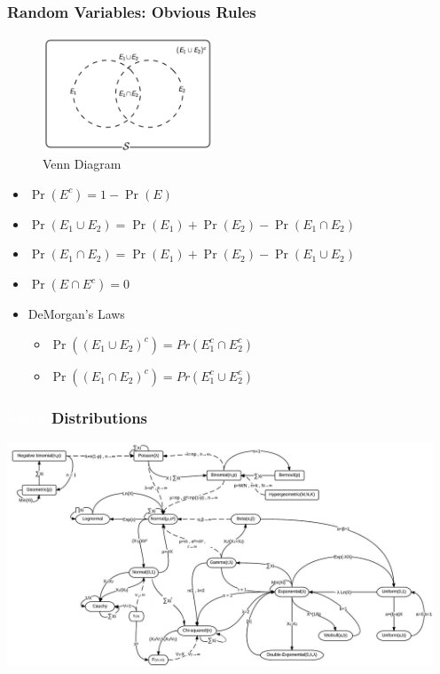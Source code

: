 \documentclass[xcolor={dvipsnames}]{beamer}
\begin{document}
\frame
{
 \frametitle{Random Variables: Obvious Rules}

\begin{figure}
\centering
\includegraphics[width=2in]{stuff/venn.png}  \\
Venn Diagram
\end{figure}
\vspace{-1em}
\begin{itemize}
\item $\Pr(E^c) = 1 - \Pr(E)$
\item<2-> $\Pr(E_1 \cup E_2) = \Pr(E_1) + \Pr(E_2) -  \Pr(E_1 \cap E_2)$
\item<3-> $\Pr(E_1 \cap E_2) = \Pr(E_1) + \Pr(E_2) -  \Pr(E_1 \cup E_2)$
\item<4-> $\Pr(E \cap E^c) = 0$
\item<5-> DeMorgan's Laws
\begin{itemize}
\item $\Pr\left((E_1 \cup E_2)^c\right) = Pr\left(E_1^c \cap E_2^c\right) $
\item $\Pr\left((E_1 \cap E_2)^c\right) = Pr\left(E_1^c \cup E_2^c\right)$
\end{itemize}
\end{itemize}
}

\frame
{
 \frametitle{\textcolor{white}{More} Distributions}

\hspace*{-2.5em}\includegraphics[width=5in]{stuff/relationships.jpg}  
}
\end{document}
